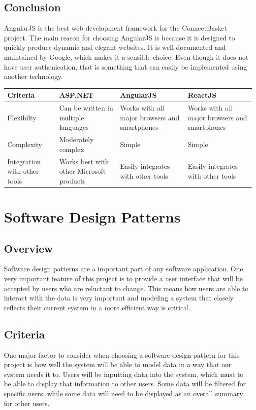 \documentclass[onecolumn, draftclsnofoot,10pt, compsoc]{IEEEtran}
\begin{document}
\subsection{Conclusion}
AngularJS is the best web development framework for the ConnectBasket project. The main reason for choosing AngularJS is because it is designed to quickly produce dynamic and elegant websites. It is well-documented and maintained by Google, which makes it a sensible choice. Even though it does not have user authenication, that is something that can easily be implemented using another technology. 

\begin{table}[h!]
\centering
\begin{tabular}{ |p{.2\linewidth}|p{.2\linewidth}|p{.2\linewidth}|p{.2\linewidth}| } 
\hline
\textbf{Criteria} & \textbf{ASP.NET} & \textbf{AngularJS} & \textbf{ReactJS} \\ \hline
Flexibilty & Can be written in multiple languages & Works with all major browsers and smartphones & Works with all major browsers and smartphones \\ \hline
Complexity & Moderately complex & Simple & Simple\\ \hline
Integration with other tools & Works best with other Microsoft products & Easily integrates with other tools & Easily integrates with other tools \\ \hline
\end{tabular}
\end{table}

\section{Software Design Patterns}

\subsection{Overview}
Software design patterns are a important part of any software application. One very important feature of this project is to provide a user interface that will be accepted by users who are reluctant to change. This means how users are able to interact with the data is very important and modeling a system that closely reflects their current system in a more efficient way is critical.

\subsection{Criteria}
One major factor to consider when choosing a software design pattern for this project is how well the system will be able to model data in a way that our system needs it to. Users will be inputting data into the system, which must to be able to display that information to other users. Some data will be filtered for specific users, while some data will need to be displayed as an overall summary for other users.
\end{document}
